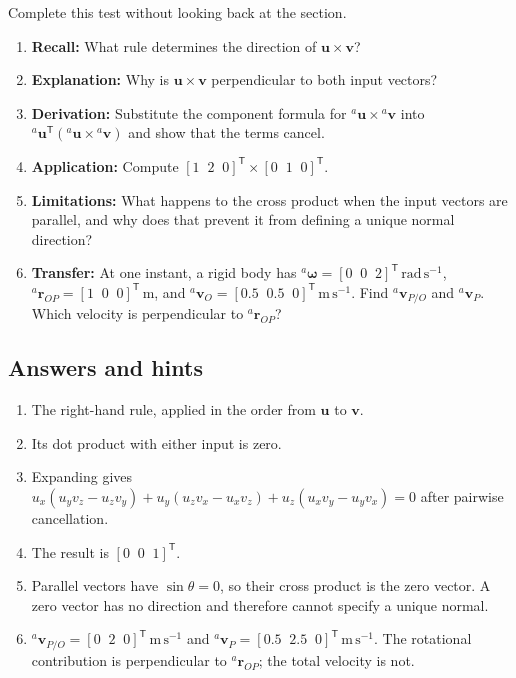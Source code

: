 \documentclass[
  australian,
  12pt,
  letterpaper,
  DIV=11,
  numbers=noendperiod,
  twoside]{scrreprt}
\providecommand{\tightlist}{%
  \setlength{\itemsep}{0pt}\setlength{\parskip}{0pt}}
\begin{document}

Complete this test without looking back at the section.

\begin{enumerate}
\def\labelenumi{\arabic{enumi}.}
\tightlist
\item
  \textbf{Recall:} What rule determines the direction of
  \(\mathbf u\times\mathbf v\)?
\item
  \textbf{Explanation:} Why is \(\mathbf u\times\mathbf v\)
  perpendicular to both input vectors?
\item
  \textbf{Derivation:} Substitute the component formula for
  \({}^{a}\mathbf u\times{}^{a}\mathbf v\) into
  \({}^{a}\mathbf u^{\mathsf T}({}^{a}\mathbf u\times{}^{a}\mathbf v)\)
  and show that the terms cancel.
\item
  \textbf{Application:} Compute
  \([1\;\;2\;\;0]^\mathsf T\times[0\;\;1\;\;0]^\mathsf T\).
\item
  \textbf{Limitations:} What happens to the cross product when the input
  vectors are parallel, and why does that prevent it from defining a
  unique normal direction?
\item
  \textbf{Transfer:} At one instant, a rigid body has
  \({}^{a}\boldsymbol{\omega}=[0\;\;0\;\;2]^\mathsf{T}\,\mathrm{rad\,s^{-1}}\),
  \({}^{a}\mathbf r_{OP}=[1\;\;0\;\;0]^\mathsf{T}\,\mathrm{m}\), and
  \({}^{a}\mathbf v_O=[0.5\;\;0.5\;\;0]^\mathsf{T}\,\mathrm{m\,s^{-1}}\).
  Find \({}^{a}\mathbf v_{P/O}\) and \({}^{a}\mathbf v_P\). Which
  velocity is perpendicular to \({}^{a}\mathbf r_{OP}\)?
\end{enumerate}

\subsection*{Answers and hints}\label{answers-and-hints-4}

\begin{enumerate}
\def\labelenumi{\arabic{enumi}.}
\tightlist
\item
  The right-hand rule, applied in the order from \(\mathbf u\) to
  \(\mathbf v\).
\item
  Its dot product with either input is zero.
\item
  Expanding gives
  \(u_x(u_yv_z-u_zv_y)+u_y(u_zv_x-u_xv_z)+u_z(u_xv_y-u_yv_x)=0\) after
  pairwise cancellation.
\item
  The result is \([0\;\;0\;\;1]^\mathsf T\).
\item
  Parallel vectors have \(\sin\theta=0\), so their cross product is the
  zero vector. A zero vector has no direction and therefore cannot
  specify a unique normal.
\item
  \({}^{a}\mathbf v_{P/O}=[0\;\;2\;\;0]^\mathsf T\,\mathrm{m\,s^{-1}}\)
  and
  \({}^{a}\mathbf v_P=[0.5\;\;2.5\;\;0]^\mathsf T\,\mathrm{m\,s^{-1}}\).
  The rotational contribution is perpendicular to
  \({}^{a}\mathbf r_{OP}\); the total velocity is not.
\end{enumerate}
\end{document}
